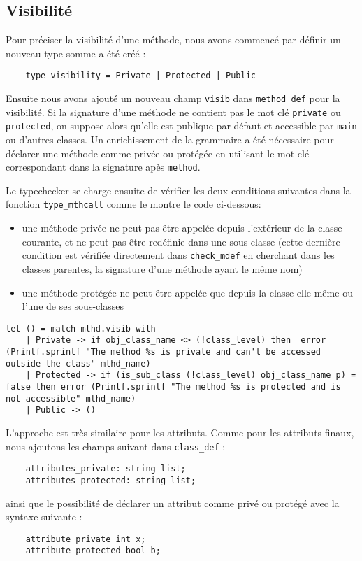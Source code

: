 \documentclass{article}
\begin{document}
\subsection{Visibilité}
Pour préciser la visibilité d'une méthode, nous avons commencé par définir 
un nouveau type somme a été créé : 
\begin{verbatim}
    type visibility = Private | Protected | Public
\end{verbatim}
Ensuite nous avons ajouté un nouveau champ \texttt{visib} dans \texttt{method\_def} pour la visibilité. Si la signature d'une méthode ne contient pas le mot clé \texttt{private} ou \texttt{protected}, on suppose alors qu'elle est publique par défaut et accessible par \texttt{main} ou d'autres classes.
Un enrichissement de la grammaire a été nécessaire pour déclarer une méthode comme privée ou protégée en utilisant le mot clé correspondant dans la signature apès \texttt{method}.

Le typechecker se charge ensuite de vérifier les deux conditions suivantes dans la fonction \texttt{type\_mthcall} comme le montre le code ci-dessous: 
\begin{itemize}
    \item une méthode privée ne peut pas être appelée depuis l'extérieur de la classe courante, et ne peut pas être redéfinie dans une sous-classe (cette dernière condition est vérifiée directement dans \texttt{check\_mdef} en cherchant dans les classes parentes, la signature d'une méthode ayant le même nom)
    \item une méthode protégée ne peut être appelée que depuis la classe elle-même ou l'une de ses sous-classes
\end{itemize}
\begin{lstlisting}[style=mystyle, language=caml]
let () = match mthd.visib with
    | Private -> if obj_class_name <> (!class_level) then  error (Printf.sprintf "The method %s is private and can't be accessed outside the class" mthd_name)
    | Protected -> if (is_sub_class (!class_level) obj_class_name p) = false then error (Printf.sprintf "The method %s is protected and is not accessible" mthd_name)
    | Public -> ()     
\end{lstlisting}

L'approche est très similaire pour les attributs. Comme pour les attributs finaux, nous ajoutons les champs suivant dans \texttt{class\_def} : 
\begin{verbatim}
    attributes_private: string list;
    attributes_protected: string list;
\end{verbatim}
ainsi que le possibilité de déclarer un attribut comme privé ou protégé avec la syntaxe suivante : 
\begin{verbatim}
    attribute private int x;
    attribute protected bool b;
\end{verbatim}
\end{document}

